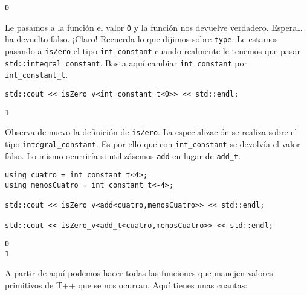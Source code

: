 \documentclass[11pt]{article}
\begin{document}
\begin{verbatim}
0
\end{verbatim}


Le pasamos a la función el valor \texttt{0} y la función nos devuelve verdadero. Espera\ldots{} ha devuelto falso. ¡Claro! Recuerda lo que dijimos sobre \texttt{type}. Le estamos pasando a \texttt{isZero} el tipo \texttt{int\_constant} cuando realmente le tenemos que pasar \texttt{std::integral\_constant}. Basta aquí cambiar \texttt{int\_constant} por \texttt{int\_constant\_t}.

\begin{verbatim}
std::cout << isZero_v<int_constant_t<0>> << std::endl;
\end{verbatim}

\begin{verbatim}
1
\end{verbatim}


Observa de nuevo la definición de \texttt{isZero}. La especialización se realiza sobre el tipo \texttt{integral\_constant}. Es por ello que con \texttt{int\_constant} se devolvía el valor falso. Lo mismo ocurriría si utilizásemos \texttt{add} en lugar de \texttt{add\_t}.

\begin{verbatim}
using cuatro = int_constant_t<4>;
using menosCuatro = int_constant_t<-4>;

std::cout << isZero_v<add<cuatro,menosCuatro>> << std::endl;

std::cout << isZero_v<add_t<cuatro,menosCuatro>> << std::endl;
\end{verbatim}

\begin{verbatim}
0
1
\end{verbatim}


A partir de aquí podemos hacer todas las funciones que manejen valores primitivos de T++ que se nos ocurran. Aquí tienes unas cuantas:
\end{document}
